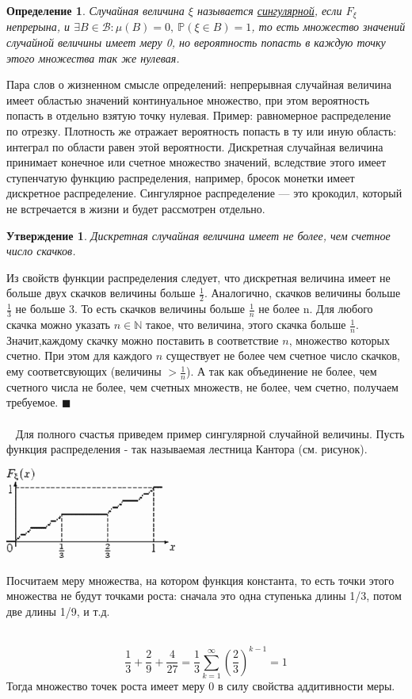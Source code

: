 \documentclass[12pt]{article}
\newtheorem{Def}{Определение}
\newtheorem{St}{Утверждение}
\newenvironment{Proof}{\par\noindent{\bf Доказательство}}{$\blacksquare$}
\newenvironment{Ex}{{\bf Пример}\ }{}
\numberwithin{Th}{section}
\numberwithin{Def}{section}
\numberwithin{Lem}{section}
\numberwithin{St}{section}
\numberwithin{equation}{section}
\newcommand\Pro{\mathbb{P}} %
\newcommand\Bor{\mathscr{B}} %
\begin{document}
\begin{Def}
	Случайная величина $\xi$  называется \underline{сингулярной}, если $F_\xi$ непрерына, и $\exists B \in \Bor \colon \mu(B) = 0, \ \Pro(\xi \in B) = 1$, то есть множество значений случайной величины имеет меру 0, но вероятность попасть в каждую точку этого множества так же нулевая.
\end{Def}

Пара слов о жизненном смысле определений: непрерывная случайная величина имеет областью значений континуальное множество, при этом вероятность попасть в отдельно взятую точку нулевая. Пример: равномерное распределение по отрезку. Плотность же отражает вероятность попасть в ту или иную область: интеграл по области равен этой вероятности. Дискретная случайная величина принимает конечное или счетное множество значений, вследствие этого имеет ступенчатую функцию распределения, например, бросок монетки имеет дискретное распределение. Сингулярное распределение --- это крокодил, который 
не встречается в жизни и будет рассмотрен отдельно.

\begin{St}
	Дискретная случайная величина имеет не более, чем счетное число скачков.
\end{St}
\begin{Proof}
Из свойств функции распределения следует, что дискретная величина имеет не больше двух скачков величины больше $\frac12$. Аналогично, скачков величины больше $\frac13$ не больше 3. То есть скачков величины больше $\frac1n$ не более n. Для любого скачка можно указать $n \in \mathbb{N}$ такое, что величина, этого скачка больше 
$\frac1n$. Значит,каждому скачку можно поставить в соответствие $n$, множество которых счетно. При этом для каждого $n$ существует не более чем счетное число скачков, ему соответсвующих (величины $>\frac1n$). А так как объединение не более, чем счетного числа не более, чем счетных множеств, не более, чем счетно, получаем 
требуемое. 
\end{Proof}\\ \\
\begin{Ex}
Для полного счастья приведем пример сингулярной случайной величины. Пусть функция распределения - так называемая лестница Кантора (см. рисунок).
\parbox[b][3 cm][t]{20mm}{\includegraphics[height=30mm]{kantor}}
\hfill
\parbox[b][3 cm][t]{100mm}{
	Посчитаем меру множества, на котором функция константа, то есть точки этого множества не будут точками роста: сначала это одна ступенька длины 1/3, потом две длины 1/9, и т.д.

}\\
	$$ \frac13 + \frac29 + \frac4{27} = \frac13 \sum\limits_{k=1}^\infty(\frac23)^{k-1} = 1$$
	Тогда множество точек роста имеет меру 0 в силу свойства аддитивности меры.
\end{Ex}
\\
\end{document}
